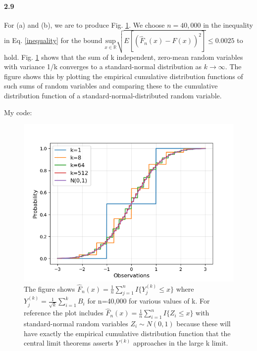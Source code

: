 \documentclass{article}
\begin{document}
\paragraph{2.9}
For (a) and (b), we are to produce Fig. \ref{fig:plot9}. We choose $n=40,000$ in the inequality in Eq. \ref{inequality} for the bound $\underset{x \in \mathds{R}}{\text{sup}} \sqrt{E[(\hat{F}_n(x)-F(x))^2]} \le 0.0025$ to hold. Fig. \ref{fig:plot9} shows that the sum of k independent, zero-mean random variables with variance 1/k converges to a standard-normal distribution as $k\longrightarrow\infty$. The figure shows this by plotting the empirical cumulative distribution functions of such sums of random variables and comparing these to the cumulative distribution function of a standard-normal-distributed random variable.

My code:


\begin{figure}
  \includegraphics[width=\linewidth]{plot_hw0p9.png}
  \caption{The figure shows $\hat{F}_n(x)=\frac{1}{n} \sum_{j=1}^{n} I\{Y^{(k)}_j\le x\}$ where $Y^{(k)}_j=\frac{1}{\sqrt{k}}\sum_{i=1}^{k}{B_i}$ for n=40,000 for various values of k. For reference the plot includes $\hat{F}_n(x)=\frac{1}{n} \sum_{i=1}^{n} I\{Z_i\le x\}$ with standard-normal random variables $Z_i \sim N(0,1)$ because these will have exactly the empirical cumulative distribution function that the central limit theorems asserts $Y^{(k)}$ approaches in the large k limit.}
  \label{fig:plot9}
\end{figure}
\end{document}
